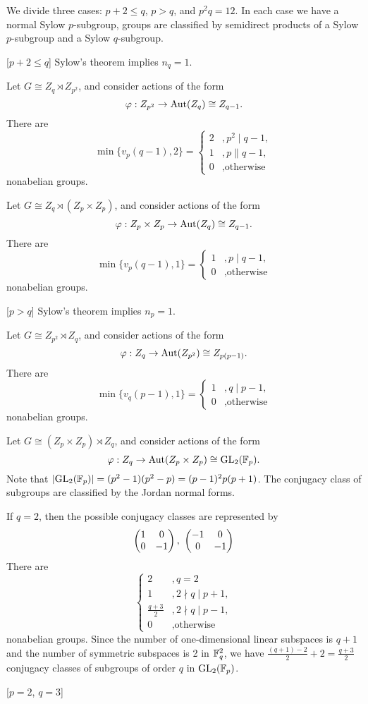 \documentclass{../note}
\begin{document}
\begin{ex}[$|G|=p^3$]
\end{ex}


\begin{ex}[$|G|=p^2q$]
We divide three cases: $p+2\le q$, $p>q$, and $p^2q=12$.
In each case we have a normal Sylow $p$-subgroup, groups are classified by semidirect products of a Sylow $p$-subgroup and a Sylow $q$-subgroup.

\bigskip
{}[$p+2\le q$]
Sylow's theorem implies $n_q=1$.
\begin{parts}
\item
Let $G\cong Z_q\rtimes Z_{p^2}$, and consider actions of the form
\[\varphi:Z_{p^2}\to\operatorname{Aut}(Z_q)\cong Z_{q-1}.\]
There are
\[\min\{v_p(q-1),2\}=\begin{cases}2&,p^2\mid q-1,\\1&,p\|q-1,\\0&,\text{otherwise}\end{cases}\]
nonabelian groups.
\item
Let $G\cong Z_q\rtimes(Z_p\times Z_p)$, and consider actions of the form
\[\varphi:Z_p\times Z_p\to\operatorname{Aut}(Z_q)\cong Z_{q-1}.\]
There are
\[\min\{v_p(q-1),1\}=\begin{cases}1&,p\mid q-1,\\0&,\text{otherwise}\end{cases}\]
nonabelian groups.
\end{parts}

\bigskip
{}[$p>q$]
Sylow's theorem implies $n_p=1$.
\begin{parts}
\item
Let $G\cong Z_{p^2}\rtimes Z_q$, and consider actions of the form
\[\varphi:Z_q\to\operatorname{Aut}(Z_{p^2})\cong Z_{p(p-1)}.\]
There are
\[\min\{v_q(p-1),1\}=\begin{cases}1&,q\mid p-1,\\0&,\text{otherwise}\end{cases}\]
nonabelian groups.
\item
Let $G\cong(Z_p\times Z_p)\rtimes Z_q$, and consider actions of the form
\[\varphi:Z_q\to\operatorname{Aut}(Z_p\times Z_p)\cong\mathrm{GL}_2(\mathbb{F}_p).\]
Note that $|\mathrm{GL}_2(\mathbb{F}_p)|=(p^2-1)(p^2-p)=(p-1)^2p(p+1)$.
The conjugacy class of subgroups are classified by the Jordan normal forms.

If $q=2$, then the possible conjugacy classes are represented by
\[\mat{1&0\\0&-1},\ \mat{-1&0\\0&-1}\]
There are
\[\begin{cases}2&,q=2\\1&,2\nmid q\mid p+1,\\\frac{q+3}2&,2\nmid q\mid p-1,\\0&,\text{otherwise}\end{cases}\]
nonabelian groups.
Since the number of one-dimensional linear subspaces is $q+1$ and the number of symmetric subspaces is 2 in $\mathbb{F}_q^2$, we have $\frac{(q+1)-2}2+2=\frac{q+3}2$ conjugacy classes of subgroups of order $q$ in $\mathrm{GL}_2(\mathbb{F}_p)$.
\end{parts}

[$p=2$, $q=3$]

\end{ex}
\end{document}
